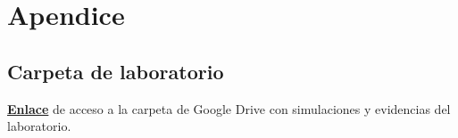 \section{Apendice}
\subsection{Carpeta de laboratorio}
\href{google.com}{\textbf{Enlace}} de acceso a la carpeta de Google Drive con simulaciones y evidencias del laboratorio.
